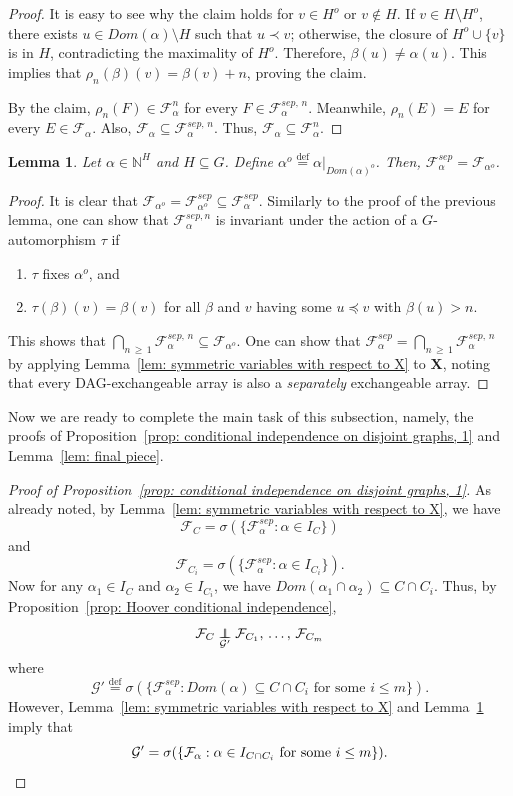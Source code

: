 \documentclass[10pt]{amsart}
\newtheorem{lemm}[theo]{Lemma}\newtheorem{prop}[theo]{Proposition}\newtheorem{coro}[theo]{Corollary}\newtheorem{conj}[theo]{Conjecture}
\theoremstyle{definition}\newtheorem{defi}[theo]{Definition}\newtheorem{rema}[theo]{Remark}\newtheorem{exam}[theo]{Example}\newtheorem{exem}[theo]{Example}\newtheorem{nota}[theo]{Notation}
\newcommand{\independent}{\protect\mathpalette{\protect\independenT}{\perp}}\def\independenT#1#2{\mathrel{\rlap{$#1#2$}\mkern2mu{#1#2}}}
\newcommand{\alf}{\alpha}%
\newcommand*\bb{\beta}
\newcommand*{\defeq}{\stackrel{\mathrm{def}}{=}}
\newcommand*{\sep}{\mathit{sep}}
\newcommand*\dom{\mathit{Dom}}
\newcommand*\N{\mathbb{N}}
\newcommand*\FF{\mathcal{F}}
\newcommand*\GG{\mathcal{G}}
\newcommand*\bX{\mathbf{X}}
\begin{document}
\begin{proof}
It is easy to see why the claim holds for $v \in H^o$ or $v \notin H$. If $v \in H \setminus H^o$, there exists $u \in \dom(\alf)\setminus H$ such that $u \prec v$; otherwise, the closure of $H^o \cup \{v\}$ is in $H$, contradicting the maximality of $H^o$. Therefore, $\bb(u) \neq \alf(u)$. This implies that $\rho_n(\bb)(v)=\bb(v)+n$, proving the claim.

By the claim, $\rho_n (F) \in \FF_\alf^n$ for every $F \in \mathcal{F}_\alf^{\sep,\,n}$. Meanwhile, $\rho_n(E)=E$ for every $E \in \FF_\alf $. Also, $\FF_\alf \subseteq \mathcal{F}_\alf^{\sep,\,n}$. Thus, $\FF_\alf \subseteq \FF_\alf^n$.
\end{proof}



\begin{lemm}\label{lem:separate symmetry is null}
Let $\alf \in \N^H$ and $H \subseteq G$.
Define $\alf^o
\defeq\alf|_{\dom(\alf)^o}$. Then, $\FF_\alf^{\sep}=\FF_{\alf^o}$.
\end{lemm}

\begin{proof}
It is clear that $\FF_{\alf^o}=\FF_{\alf^o}^{\sep} \subseteq \FF_\alf^{\sep}$. Similarly to the proof of the previous lemma, one can show that $\mathcal{F}_\alf^{\sep,n}$ is invariant under the action of a $G$-automorphism $\tau$ if
\begin{enumerate}
\item $\tau$ fixes $\alf^o$, and
\item $\tau(\bb)(v)=\bb(v)$ for all $\bb$ and $v$ having some $u \preceq v$ with $\bb(u)>n$.
\end{enumerate}
This shows that $\bigcap_{n\,\geq\,1} \mathcal{F}_\alf^{\sep,\,n} \subseteq \FF_{\alf^o}$. One can show that $\FF_\alf^{\sep} = \bigcap_{n\,\geq\,1} \mathcal{F}_\alf^{\sep,\,n}$ by applying Lemma~\ref{lem: symmetric variables with respect to X} to $\bX$, noting that every DAG-exchangeable array is also a \emph{separately} exchangeable array.
\end{proof}

Now we are ready to complete the main task of this subsection, namely, the proofs of Proposition~\ref{prop: conditional independence on disjoint graphs, 1} and Lemma~\ref{lem: final piece}.

\begin{proof}[Proof of Proposition~\ref{prop: conditional independence on disjoint graphs, 1}]
As already noted, by Lemma~\ref{lem: symmetric variables with respect to X}, we have
\[
\FF_C=\sigma(\{\FF_\alf^{\sep}: \alf \in I_C\})
\]
and
\[
\FF_{C_i}=\sigma(\{\FF_\alf^{\sep}: \alf \in I_{C_i}\}).
\]
Now for any $\alf_1 \in I_C$ and $\alf_2 \in I_{C_i}$, we have $\dom(\alf_1 \cap \alf_2) \subseteq C \cap C_i$. Thus, by Proposition~\ref{prop: Hoover conditional independence},
\[
\FF_C \underset{\GG'}{\independent} \FF_{C_1},\,\ldots,\, \FF_{C_m}
\]
where
\[
\GG'
\defeq\sigma(\{\FF_\alf^{\sep}: \dom(\alf) \subseteq C \cap C_i \text{ for some } i \leq m \}).
\]
However, Lemma~\ref{lem: symmetric variables with respect to X} and Lemma~\ref{lem:separate symmetry is null} imply that
\[
\GG' = \sigma(\{\FF_\alf : \alf \in I_{C \cap C_i} \text{ for some } i \leq m\}).\qedhere
\]
\end{proof}
\end{document}
